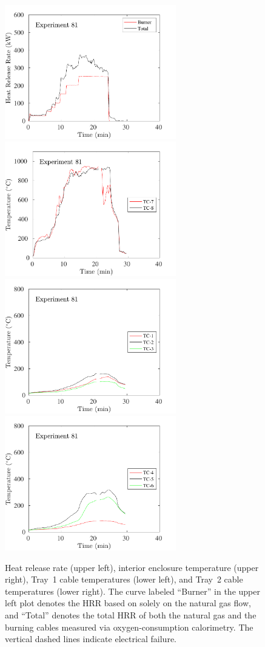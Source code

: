 \begin{figure}[H]
\includegraphics[height=2.30in]{../SCRIPT_FIGURES/Test_81_HRR} \hfill
\includegraphics[height=2.30in]{../SCRIPT_FIGURES/Test_81_TC_7-8} \\
\includegraphics[height=2.30in]{../SCRIPT_FIGURES/Test_81_TC_1-3} \hfill
\includegraphics[height=2.30in]{../SCRIPT_FIGURES/Test_81_TC_4-6}
\caption[HRR and temperatures of Experiment 81]{Heat release rate (upper left), interior enclosure temperature (upper right), Tray~1 cable temperatures (lower left), and Tray~2 cable temperatures (lower right). The curve labeled ``Burner'' in the upper left plot denotes the HRR based on solely on the natural gas flow, and ``Total'' denotes the total HRR of both the natural gas and the burning cables measured via oxygen-consumption calorimetry. The vertical dashed lines indicate electrical failure.}
\label{fig:Test_81}
\end{figure}


